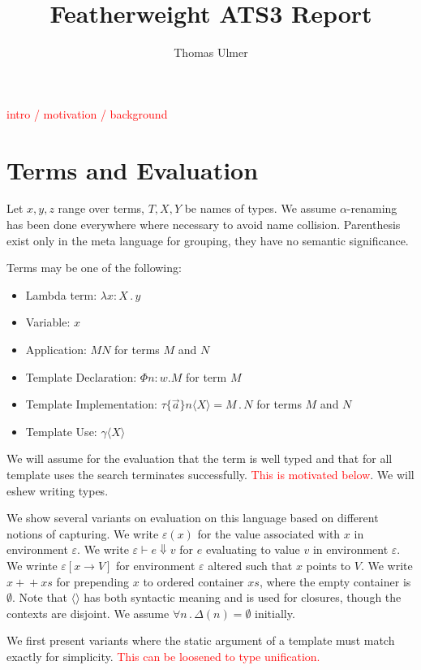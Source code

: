 \documentclass{article}
\title{Featherweight ATS3 Report}
\author{Thomas Ulmer}
\newcommand{\todo}[1]{\textcolor{red}{#1}}
\newcommand{\ve}{\varepsilon}
\newcommand{\de}{\Delta}
\newcommand{\st}{\,.\,}
\newcommand{\cl}{{\colon}}
\newcommand{\pp}{{+}\!{+}}
\newcommand{\da}{\Downarrow}
\begin{document}
\maketitle

\todo{intro / motivation / background}

\section{Terms and Evaluation}

Let $x,y,z$ range over terms, $T,X,Y$ be names of types. We assume $\alpha$-renaming has been done everywhere where necessary to avoid name collision. Parenthesis exist only in the meta language for grouping, they have no semantic significance.

Terms may be one of the following:
\begin{itemize}
\item Lambda term: $\lambda x \cl X \st y$
\item Variable: $x$
\item Application: $MN$ for terms $M$ and $N$
\item Template Declaration: $\Phi n\cl w . M$ for term $M$
\item Template Implementation: $\tau \{\vec{a}\}n\langle X\rangle = M \st N$ for terms $M$ and $N$
\item Template Use: $\gamma\langle X\rangle$
\end{itemize}

We will assume for the evaluation that the term is well typed and that for all template uses the search terminates successfully. \todo{This is motivated below}. We will eshew writing types.

We show several variants on evaluation on this language based on different notions of capturing. We write $\ve(x)$ for the value associated with $x$ in environment $\ve$. We write $\ve \vdash e \da v$ for $e$ evaluating to value $v$ in environment $\ve$. We wrinte $\ve[x \to V]$ for environment $\ve$ altered such that $x$ points to $V$. We write $x\pp xs$ for prepending $x$ to ordered container $xs$, where the empty container is $\emptyset$. Note that $\langle\rangle$ has both syntactic meaning and is used for closures, though the contexts are disjoint. We assume $\forall n \st \de(n) = \emptyset$ initially.

We first present variants where the static argument of a template must match exactly for simplicity. \todo{This can be loosened to type unification.}
\end{document}
